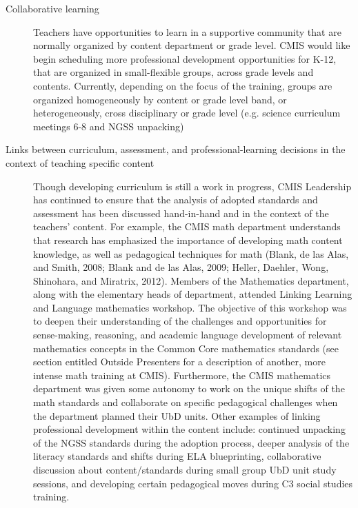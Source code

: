 \begin{findings}
\begin{description}
\item [Collaborative learning] Teachers have opportunities to learn in a supportive community that are normally organized by content department or grade level. CMIS would like begin scheduling more professional development opportunities for K-12, that are organized in small-flexible groups, across grade levels and contents. Currently, depending on the focus of the training, groups are organized homogeneously by content or grade level band, or heterogeneously, cross disciplinary or grade level (e.g. science curriculum meetings 6-8 and NGSS unpacking)
\item [Links between curriculum, assessment, and professional-learning decisions in the context of teaching specific content] Though developing curriculum is still a work in progress, CMIS Leadership has continued to ensure that the analysis of adopted standards and assessment has been discussed hand-in-hand and in the context of the teachers’ content. For example, the CMIS math department understands that research has emphasized the importance of developing math content knowledge, as well as pedagogical techniques for math (Blank, de las Alas, and Smith, 2008; Blank and de las Alas, 2009; Heller, Daehler, Wong, Shinohara, and Miratrix, 2012). Members of the Mathematics department, along with the elementary heads of department, attended Linking Learning and Language mathematics workshop. The objective of this workshop was to deepen their understanding of the challenges and opportunities for sense-making, reasoning, and academic language development of relevant  mathematics concepts in the Common Core mathematics standards (see section entitled Outside Presenters for a description of another, more intense math training at CMIS). Furthermore, the CMIS mathematics department was given some autonomy to work on the unique shifts of the math standards and collaborate on specific pedagogical challenges when the department planned their UbD units. Other examples of linking professional development within the content include: continued unpacking of the NGSS standards during the adoption process, deeper analysis of the literacy standards and shifts during ELA blueprinting, collaborative discussion about content/standards during small group UbD unit study sessions, and developing certain pedagogical moves during C3 social studies training. 

\end{description}
\end{findings}
